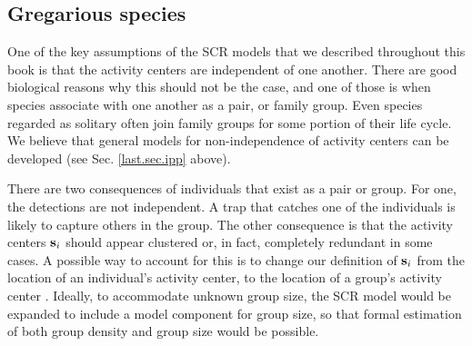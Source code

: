 \subsection{Gregarious species}

One of the key assumptions of the SCR models that we described
throughout this book is that the activity centers are independent of
one another. There are good biological reasons why this should not be
the case, and one of those is when species associate with one another
as a pair, or family group.
Even species regarded as solitary often join family
groups for some portion of their life cycle. We believe that general
models for non-independence of activity centers can be developed (see
Sec. \ref{last.sec.ipp} above).

There are two consequences of individuals that exist as a pair or
group. For one, the detections are not independent. A trap that
catches one of the individuals is likely to capture others in the
group.
The other consequence is that the activity centers ${\bf s}_{i}$
should appear clustered or, in fact, completely redundant in some
cases. A possible way to account for this is to change our definition
of ${\bf s}_i$ from the location of an individual's activity center,
to the location of a group's activity center
\citep{russell_etal:2012}. Ideally, to accommodate unknown group size,
the SCR model would be expanded to include a model component for group size,
so that formal estimation of both group density and group size would
be possible.  %


